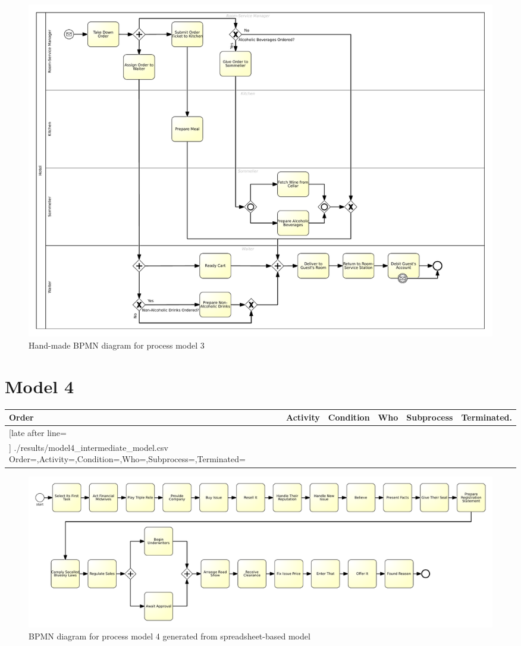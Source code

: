 \begin{figure}[H]
	\centering
	\includegraphics[width=\hsize]{./bpmn/model3.pdf}
	\caption{Hand-made BPMN diagram for process model 3}
	\label{bpmn:model3}
\end{figure}

\section{Model 4}
\begin{tcolorbox}[
	breakable,
	arc=0mm,
	left=1pt,
	right = 1pt,
	boxrule=0mm,
	colback = {white},
	]
	\texttt{}
\end{tcolorbox}
\label{txt:model4}

{\scriptsize
	\begin{longtable}{|p{0.03 \hsize}|p{0.25 \hsize}|p{0.15 \hsize}|p{0.2 \hsize}|p{0.1 \hsize}|p{0.1 \hsize}|}
		\hline
		Order & Activity & Condition & Who & Subprocess & Terminated.
		\\\hline\hline
		\csvreader[late after line=\\\hline]
		{./results/model4_intermediate_model.csv}
		{Order=\Order,Activity=\Activity,Condition=\Condition,Who=\Who,Subprocess=\Subprocess,Terminated=\Terminated}
		{\Order & \Activity & \Condition & \Who & \Subprocess & \Terminated}
		\caption{Spreadsheet-based description for process model 4}
		\label{csv:model4}
	\end{longtable}
}

\begin{figure}[H]
	\centering
	\includegraphics[scale=0.35]{./generated_bpmn/model4.pdf}
	\caption{BPMN diagram for process model 4 generated from spreadsheet-based model}
	\label{bpmn:generated_model4}
\end{figure}

